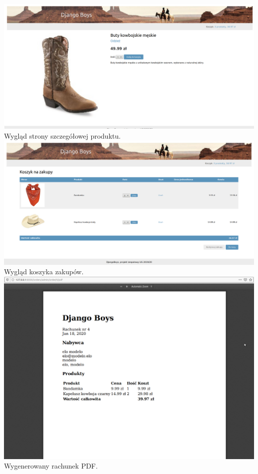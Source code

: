 \documentclass{article}
\begin{document}
\begin{center}

\includegraphics[scale=0.35]{szczegoly.png}\\
Wygląd strony szczegółowej produktu.
\includegraphics[scale=0.35]{koszyk.png}\\
Wygląd koszyka zakupów.\\[2cm]
\includegraphics[scale=0.35]{pdf.png}\\
Wygenerowany rachunek PDF.
\end{center}
\end{document}
